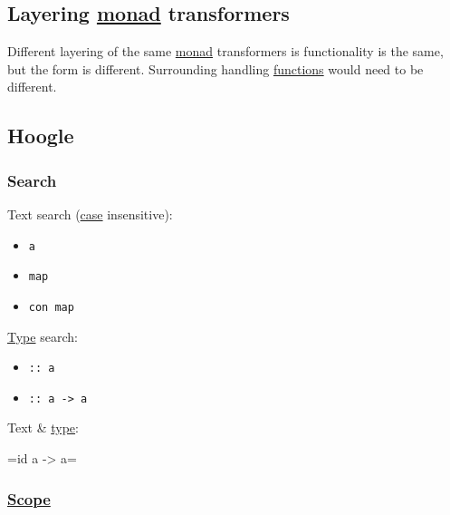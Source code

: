 \documentclass[11pt]{article}
\begin{document}
\subsection{Layering \hyperref[org268aaf1]{monad} transformers}
\label{sec:orgbd0a469}

Different layering of the same \hyperref[org268aaf1]{monad} transformers is functionality is the same, but the form is different. Surrounding handling \hyperref[org66c5288]{functions} would need to be different.\\

\subsection{Hoogle}
\label{sec:org5153570}

\subsubsection{Search}
\label{sec:org227df55}

Text search (\hyperref[org96bceb0]{case} insensitive):\\
\begin{itemize}
\item \texttt{a}\\
\item \texttt{map}\\
\item \texttt{con map}\\
\end{itemize}

\hyperref[org4fbaeb8]{Type} search:\\
\begin{itemize}
\item \texttt{:: a}\\
\item \texttt{:: a -> a}\\
\end{itemize}

Text \& \hyperref[org4fbaeb8]{type}:\\
\begin{description}
\item{=id} a -> a=\\
\end{description}

\subsubsection{\hyperref[orga4eed83]{Scope}}
\label{sec:org0a4fe85}
\end{document}
